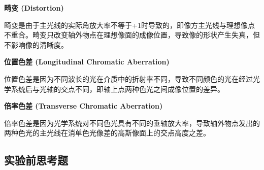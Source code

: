 \documentclass[dvipsnames, svgnames,a4paper,11pt]{article}
\begin{document}
\begin{enumerate}
		\textbf{畸变 (Distortion)}
		
		畸变是由于主光线的实际角放大率不等于+1时导致的，即像方主光线与理想像点不重合。畸变只改变轴外物点在理想像面的成像位置，导致像的形状产生失真，但不影响像的清晰度。
		
		\textbf{位置色差 (Longitudinal Chromatic Aberration)}
		
		位置色差是因为不同波长的光在介质中的折射率不同，导致不同颜色的光在经过光学系统后与光轴的交点不同，即轴上点两种色光之间成像位置的差异。
		
		\textbf{倍率色差 (Transverse Chromatic Aberration)}
		
		倍率色差是因为光学系统对不同色光具有不同的垂轴放大率，导致轴外物点发出的两种色光的主光线在消单色光像差的高斯像面上的交点高度之差。
		
	\end{enumerate}
	
	
	
	\subsection{实验前思考题}
	
\end{document}
